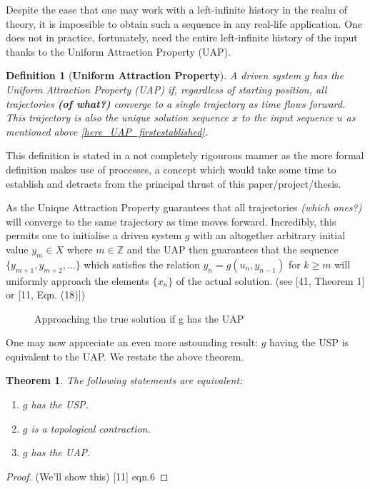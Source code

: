 \documentclass[a4paper,12pt,twoside]{book}
\newtheorem{Definition}{Definition}[]
\newtheorem{Theorem}{Theorem}[]
\begin{document}
Despite the ease that one may work with a left-infinite history in the realm of theory, it is impossible to obtain such a sequence in any real-life application.  
One does not in practice, fortunately, need the entire left-infinite history of the input thanks to the Uniform Attraction Property (UAP).

\begin{Definition}
  [\bf Uniform Attraction Property]\label{Dfn_UAP}
  A driven system $g$ has the Uniform Attraction Property (UAP) if, regardless of starting position, all trajectories \textbf{(of what?)} converge to a single trajectory as time flows forward. 
  This trajectory is also the unique solution sequence $x$ to the input sequence $u$ as mentioned above \ref{here_UAP_firstestablished}.
\end{Definition}

This definition is stated in a not completely rigourous manner as the more formal definition makes use of processes, a concept which would take some time to establish and detracts from the principal thrust of this paper/project/thesis. 

As the Unique Attraction Property guarantees that all trajectories \textit{(which ones?)} will converge to the same trajectory as time moves forward. 
Incredibly, this permits one to initialise a driven system $g$ with an altogether arbitrary initial value $y_m\in{X}$ where $m\in\mathbb{Z}$ and the UAP then guarantees that the sequence $\{y_{m+1}, y_{m+2},\ldots\}$ which satisfies the relation $y_n=g(u_n, y_{n-1})$  for  $k\geq{m}$  will uniformly approach the elements $\{x_n\}$ of the actual solution. (see [41, Theorem 1] or [11, Eqn. (18)]) 
 

\begin{figure}[ht]
  \centering
  \label{fig:memoryLosscont_time}
\caption{Approaching the true solution if g has the UAP}
\end{figure}

One may now appreciate an even more astounding result: $g$ having the USP is equivalent to the UAP. We restate the above theorem.

\begin{Theorem}
  The following statements are equivalent:
  \vspace{-8mm}
  \begin{enumerate}[noitemsep, label=\roman*.]
    \item $g$ has the USP.
    \item $g$ is a topological contraction.
    \item $g$ has the UAP.
  \end{enumerate}
\end{Theorem}
\begin{proof}
  (We'll show this)  [11] eqn.6 
\end{proof}
\end{document}
